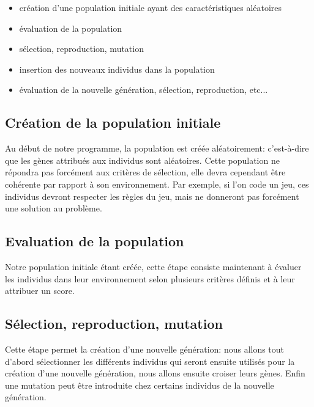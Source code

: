 \begin{itemize}
    \item création d'une population initiale ayant des caractéristiques aléatoires
    \item évaluation de la population
    \item sélection, reproduction, mutation
    \item insertion des nouveaux individus dans la population
    \item évaluation de la nouvelle génération, sélection, reproduction, etc...\\
\end{itemize}


\subsection{Création de la population initiale}

	Au début de notre programme, la population est créée aléatoirement: c'est-à-dire que les gènes attribués aux individus sont aléatoires. Cette population ne répondra pas forcément aux critères de sélection, elle devra cependant être cohérente par rapport à son environnement. Par exemple, si l'on code un jeu, ces individus devront respecter les règles du jeu, mais ne donneront pas forcément une solution au problème.\\

\subsection{Evaluation de la population}

	Notre population initiale étant créée, cette étape consiste maintenant à évaluer les individus dans leur environnement selon plusieurs critères définis et à leur attribuer un score.\\

\subsection{Sélection, reproduction, mutation}

	Cette étape permet la création d'une nouvelle génération: nous allons tout d'abord sélectionner les différents individus qui seront ensuite utilisés pour la création d'une nouvelle génération, nous allons ensuite croiser leurs gènes. Enfin une mutation peut être introduite chez certains individus de la nouvelle génération.
 
